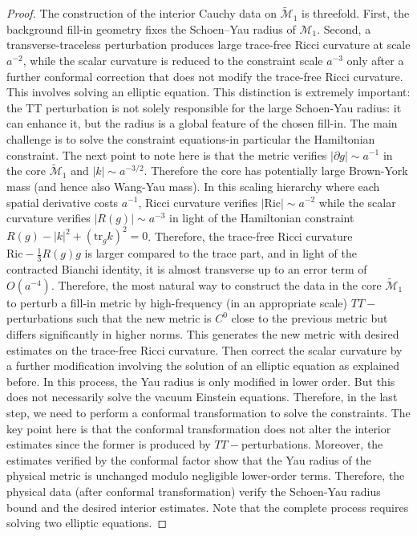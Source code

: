 \documentclass{amsart}
\newcommand{\tr}{\mbox{tr}}
\begin{document}
{\begin{proof}
The construction of the interior Cauchy data on $\widetilde{\mathcal{M}}_{1}$ is threefold.
First, the background fill-in geometry fixes the Schoen--Yau radius of
\(\mathcal M_1\). Second, a transverse-traceless perturbation produces
large trace-free Ricci curvature at scale \(a^{-2}\), while the scalar
curvature is reduced to the constraint scale \(a^{-3}\) only after a further conformal correction that does not modify the trace-free Ricci curvature. This involves solving an elliptic equation. This distinction
is extremely important: the TT perturbation is not solely responsible for the large
Schoen-Yau radius: it can enhance it, but the radius is a global feature of the chosen fill-in. The main challenge is to solve the constraint equations-in particular the Hamiltonian constraint. 
\noindent The next point to note here is that the metric verifies $|\partial g|\sim a^{-1}$ in the core $\widetilde{\mathcal{M}}_{1}$ and $|k|\sim a^{-3/2}$. Therefore the core has potentially large Brown-York mass (and hence also Wang-Yau mass). In this scaling hierarchy where each spatial derivative costs $a^{-1}$, Ricci curvature verifies $|\text{Ric}|\sim a^{-2}$ while the scalar curvature verifies $|R(g)|\sim a^{-3}$ in light of the Hamiltonian constraint $R(g)-|k|^2+(\tr_{g}k)^{2}=0$. Therefore, the trace-free Ricci curvature $\text{Ric}-\frac{1}{3}R(g)g$ is larger compared to the trace part, and in light of the contracted Bianchi identity, it is almost transverse up to an error term of $O(a^{-4})$. Therefore, the most natural way to construct the data in the core $\widetilde{\mathcal{M}}_{1}$ to perturb a  fill-in metric by high-frequency (in an appropriate scale) $TT-$ perturbations such that the new metric is $C^{0}$ close to the previous metric but differs significantly in higher norms. This generates the new metric with desired estimates on the trace-free Ricci curvature. Then correct the scalar curvature by a further modification involving the solution of an elliptic equation as explained before. In this process, the Yau radius is only modified in lower order. But this does not necessarily solve the vacuum Einstein equations. Therefore, in the last step, we need to perform a conformal transformation to solve the constraints. The key point here is that the conformal transformation does not alter the interior estimates since the former is produced by $TT-$perturbations. Moreover, the estimates verified by the conformal factor show that the Yau radius of the physical metric is unchanged modulo negligible lower-order terms.  Therefore, the physical data (after conformal transformation) verify the Schoen-Yau radius bound and the desired interior estimates. Note that the complete process requires solving two elliptic equations. 


\end{proof}}
\end{document}

